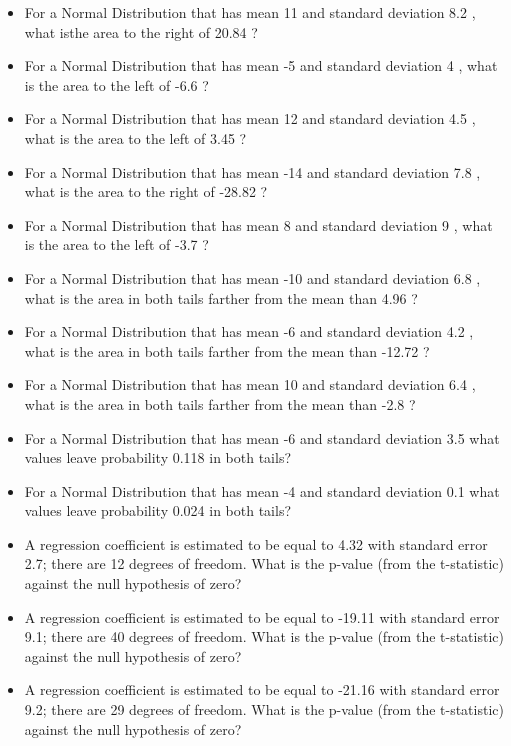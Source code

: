 \documentclass[]{article}
\providecommand{\tightlist}{%
  \setlength{\itemsep}{0pt}\setlength{\parskip}{0pt}}
\begin{document}
\begin{itemize}
\tightlist
\item
  For a Normal Distribution that has mean 11 and standard deviation 8.2
  , what isthe area to the right of 20.84 ?
\item
  For a Normal Distribution that has mean -5 and standard deviation 4 ,
  what is the area to the left of -6.6 ?
\item
  For a Normal Distribution that has mean 12 and standard deviation 4.5
  , what is the area to the left of 3.45 ?
\item
  For a Normal Distribution that has mean -14 and standard deviation 7.8
  , what is the area to the right of -28.82 ?
\item
  For a Normal Distribution that has mean 8 and standard deviation 9 ,
  what is the area to the left of -3.7 ?
\item
  For a Normal Distribution that has mean -10 and standard deviation 6.8
  , what is the area in both tails farther from the mean than 4.96 ?
\item
  For a Normal Distribution that has mean -6 and standard deviation 4.2
  , what is the area in both tails farther from the mean than -12.72 ?
\item
  For a Normal Distribution that has mean 10 and standard deviation 6.4
  , what is the area in both tails farther from the mean than -2.8 ?
\item
  For a Normal Distribution that has mean -6 and standard deviation 3.5
  what values leave probability 0.118 in both tails?
\item
  For a Normal Distribution that has mean -4 and standard deviation 0.1
  what values leave probability 0.024 in both tails?
\item
  A regression coefficient is estimated to be equal to 4.32 with
  standard error 2.7; there are 12 degrees of freedom. What is the
  p-value (from the t-statistic) against the null hypothesis of zero?
\item
  A regression coefficient is estimated to be equal to -19.11 with
  standard error 9.1; there are 40 degrees of freedom. What is the
  p-value (from the t-statistic) against the null hypothesis of zero?
\item
  A regression coefficient is estimated to be equal to -21.16 with
  standard error 9.2; there are 29 degrees of freedom. What is the
  p-value (from the t-statistic) against the null hypothesis of zero?
\end{itemize}
\end{document}
